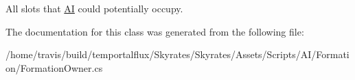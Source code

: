 All slots that \hyperlink{namespace_skyrates_1_1_a_i}{A\-I} could potentially occupy. 



The documentation for this class was generated from the following file\-:\begin{DoxyCompactItemize}
\item 
/home/travis/build/temportalflux/\-Skyrates/\-Skyrates/\-Assets/\-Scripts/\-A\-I/\-Formation/Formation\-Owner.\-cs\end{DoxyCompactItemize}

